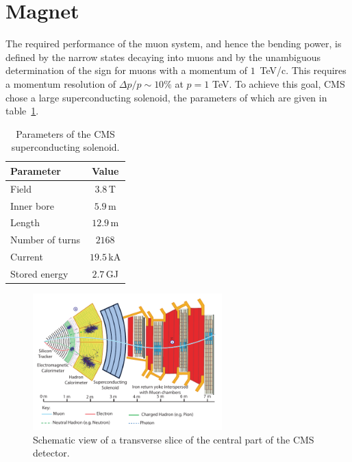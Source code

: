 \section{Magnet}
The required performance of the muon system, and hence the bending power, is defined by the narrow states decaying into muons and by the unambiguous determination of the sign for muons with a momentum of $ 1\,$ TeV/c. This requires a momentum resolution of $\Delta p / p \sim 10\%$ at $p = 1$ TeV.  To achieve this goal, CMS chose a large superconducting solenoid, the parameters of which are given in table~\ref{tab:magnetParameters}. 
\begin{table}[h!]
\centering

 \begin{tabular}{ l  c }
\toprule
Parameter & Value \\
  \midrule
  Field & $3.8\,$T \\
  Inner bore & $5.9 \,$m \\
  Length & $12.9 \,$m \\
  Number of turns & $2168$ \\
  Current & $19.5 \,$kA \\
  Stored energy & $2.7 \,$GJ\\
  \bottomrule
 \end{tabular}
 \caption{Parameters of the CMS superconducting solenoid.}
\label{tab:magnetParameters}
\end{table}
\begin{figure}[h!]
 \centering
 \includegraphics[width=0.65\textwidth]{Images/cms_slice.pdf}
 \caption{Schematic view of a transverse slice of the central part of the CMS detector.}
\label{fig:cmsSection}
\end{figure}
 
